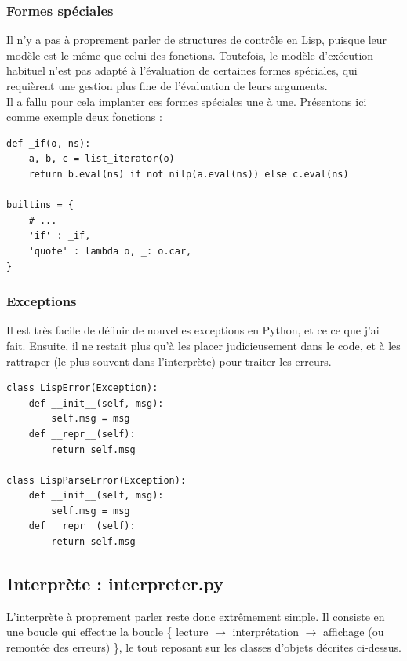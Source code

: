 \documentclass{article}
\begin{document}
\subsubsection{Formes spéciales}
Il n'y a pas à proprement parler de structures de contrôle en Lisp, puisque leur modèle est le même
que celui des fonctions. Toutefois, le modèle d’exécution habituel n'est pas adapté à l'évaluation
de certaines formes spéciales, qui requièrent une gestion plus fine de l'évaluation de leurs arguments.
\\
Il a fallu pour cela implanter ces formes spéciales une à une. Présentons ici comme exemple deux fonctions :

\begin{verbatim}
def _if(o, ns):
    a, b, c = list_iterator(o)
    return b.eval(ns) if not nilp(a.eval(ns)) else c.eval(ns)

builtins = {
    # ...
    'if' : _if,
    'quote' : lambda o, _: o.car,
}
\end{verbatim}

\subsubsection{Exceptions}
Il est très facile de définir de nouvelles exceptions en Python, et ce ce que j'ai fait. 
Ensuite, il ne restait plus qu'à les placer judicieusement dans le code, et à les rattraper 
(le plus souvent dans l'interprète) pour traiter les erreurs.

\begin{verbatim}
class LispError(Exception):
    def __init__(self, msg):
        self.msg = msg
    def __repr__(self):
        return self.msg

class LispParseError(Exception):
    def __init__(self, msg):
        self.msg = msg
    def __repr__(self):
        return self.msg
\end{verbatim}

\subsection{Interprète : interpreter.py}
L'interprète à proprement parler reste donc extrêmement simple. 
Il consiste en une boucle qui effectue la boucle \{ lecture $\rightarrow$ interprétation $\rightarrow$ affichage (ou remontée des erreurs) \}, 
le tout reposant sur les classes d'objets décrites ci-dessus.
\end{document}
